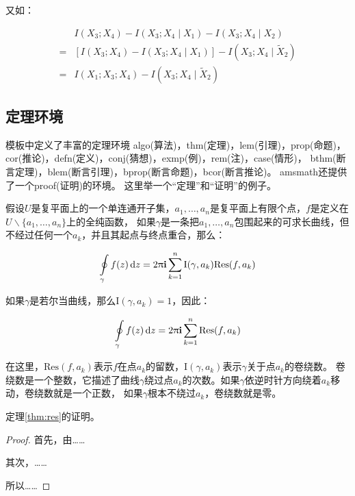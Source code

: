 又如：

\begin{align}
  \label{eq:none}
  & I(X_3;X_4)-I(X_3;X_4\mid{}X_1)-I(X_3;X_4\mid{}X_2) \nonumber \\
  = & [I(X_3;X_4)-I(X_3;X_4\mid{}X_1)]-I(X_3;X_4\mid{}\tilde{X}_2) \\
  = & I(X_1;X_3;X_4)-I(X_3;X_4\mid{}\tilde{X}_2)
\end{align}

\subsection{定理环境}

模板中定义了丰富的定理环境
algo(算法)，thm(定理)，lem(引理)，prop(命题)，cor(推论)，defn(定义)，conj(猜想)，exmp(例)，rem(注)，case(情形)，
bthm(断言定理)，blem(断言引理)，bprop(断言命题)，bcor(断言推论)。
amsmath还提供了一个proof(证明)的环境。
这里举一个``定理''和``证明''的例子。
\begin{thm}[留数定理]
\label{thm:res}
  假设$U$是复平面上的一个单连通开子集，$a_1,\ldots,a_n$是复平面上有限个点，$f$是定义在$U\backslash \{a_1,\ldots,a_n\}$上的全纯函数，
  如果$\gamma$是一条把$a_1,\ldots,a_n$包围起来的可求长曲线，但不经过任何一个$a_k$，并且其起点与终点重合，那么：

  \begin{equation}
    \label{eq:res}
    \ointop_{\gamma}f(z)\,\mathrm{d}z = 2\uppi\mathbf{i}\sum^n_{k=1}\mathrm{I}(\gamma,a_k)\mathrm{Res}(f,a_k)
  \end{equation}

  如果$\gamma$是若尔当曲线，那么$\mathrm{I}(\gamma, a_k)=1$，因此：

  \begin{equation}
    \label{eq:resthm}
    \ointop_{\gamma}f(z)\,\mathrm{d}z = 2\uppi\mathbf{i}\sum^n_{k=1}\mathrm{Res}(f,a_k)
  \end{equation}


  在这里，$\mathrm{Res}(f, a_k)$表示$f$在点$a_k$的留数，$\mathrm{I}(\gamma,a_k)$表示$\gamma$关于点$a_k$的卷绕数。
  卷绕数是一个整数，它描述了曲线$\gamma$绕过点$a_k$的次数。如果$\gamma$依逆时针方向绕着$a_k$移动，卷绕数就是一个正数，
  如果$\gamma$根本不绕过$a_k$，卷绕数就是零。

  定理\ref{thm:res}的证明。
  
  \begin{proof}
    首先，由……

    其次，……

    所以……
  \end{proof}
\end{thm}

